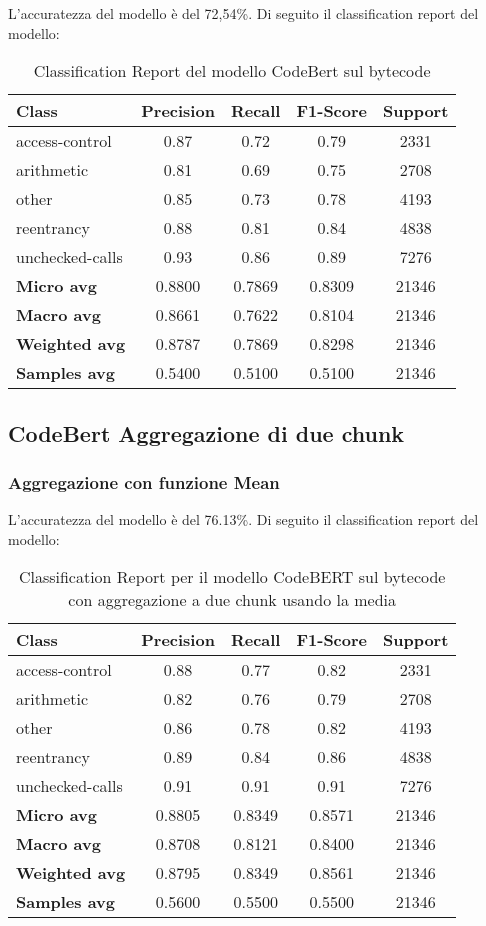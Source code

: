\documentclass[../../Thesis.tex]{subfiles}
\begin{document}
L'accuratezza del modello è del 72,54\%. Di seguito il classification report del modello: 
\begin{table}[H]
\centering
\small
\begin{tabular}{lcccc}
\hline
\textbf{Class} & \textbf{Precision} & \textbf{Recall} & \textbf{F1-Score} & \textbf{Support} \\
\hline
access-control & 0.87 & 0.72 & 0.79 & 2331 \\
arithmetic & 0.81 & 0.69 & 0.75 & 2708 \\
other & 0.85 & 0.73 & 0.78 & 4193 \\
reentrancy & 0.88 & 0.81 & 0.84 & 4838 \\
unchecked-calls & 0.93 & 0.86 & 0.89 & 7276 \\
\hline
\textbf{Micro avg} & 0.8800 & 0.7869 & 0.8309 & 21346 \\
\textbf{Macro avg} & 0.8661 & 0.7622 & 0.8104 & 21346 \\
\textbf{Weighted avg} & 0.8787 & 0.7869 & 0.8298 & 21346 \\
\textbf{Samples avg} & 0.5400 & 0.5100 & 0.5100 & 21346 \\
\hline
\end{tabular}
\caption{Classification Report del modello CodeBert sul bytecode}
\end{table}

\subsection{CodeBert Aggregazione di due chunk}
\subsubsection{Aggregazione con funzione Mean}
L'accuratezza del modello è del 76.13\%. Di seguito il classification report del modello:
\begin{table}[H]
    \centering
    \small
    \begin{tabular}{lcccc}
    \hline
    \textbf{Class} & \textbf{Precision} & \textbf{Recall} & \textbf{F1-Score} & \textbf{Support} \\
    \hline
    access-control & 0.88 & 0.77 & 0.82 & 2331 \\
    arithmetic & 0.82 & 0.76 & 0.79 & 2708 \\
    other & 0.86 & 0.78 & 0.82 & 4193 \\
    reentrancy & 0.89 & 0.84 & 0.86 & 4838 \\
    unchecked-calls & 0.91 & 0.91 & 0.91 & 7276 \\
    \hline
    \textbf{Micro avg} & 0.8805 & 0.8349 & 0.8571 & 21346 \\
    \textbf{Macro avg} & 0.8708 & 0.8121 & 0.8400 & 21346 \\
    \textbf{Weighted avg} & 0.8795 & 0.8349 & 0.8561 & 21346 \\
    \textbf{Samples avg} & 0.5600 & 0.5500 & 0.5500 & 21346 \\
    \hline
    \end{tabular}
    \caption{Classification Report per il modello CodeBERT sul bytecode con aggregazione a due chunk usando la media}
    \end{table}
    
\end{document}
